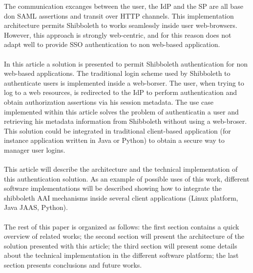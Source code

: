 The communication excanges between the user, the IdP and the SP are all base don SAML assertions and transit over HTTP channels.
This implementation architecture permits Shibboleth to works seamlessly inside user web-browsers.
However, this approach is strongly web-centric, and for this reason does not adapt well to provide SSO authentication to non web-based
application.\\
\\
In this article a solution is presented to permit Shibboleth authentication for non web-based applications.
The traditional login scheme used by Shibboleth to authenticate users is implemented inside a web-borser.
The user, when trying to log to a web resources, is redirected to the IdP to perform authentication and obtain authorization assertions via
his session metadata.
The use case implemented within this article solves the problem of authenticatin a user and retrieving his metadata information from Shibboleth
without using a web-broser.
This solution could be integrated in traditional client-based application (for instance application written in Java or Python) to obtain
a secure way to manager user logins.\\
\\
This article will describe the architecture and the technical implementation of this authentication solution.
As an example of possible uses of this work, different software implementations will be described showing how to integrate the shibboleth AAI
mechanisms inside several client applications (Linux platform, Java JAAS, Python).\\
\\
The rest of this paper is organized as follows: the first section contains a quick overview of related works; the second section will present
the architecture of the solution presented with this article; the third section will present some details about the technical implementation
in the different software platform; the last section presents conclusions and future works.

\label{sec:relatedworks}
